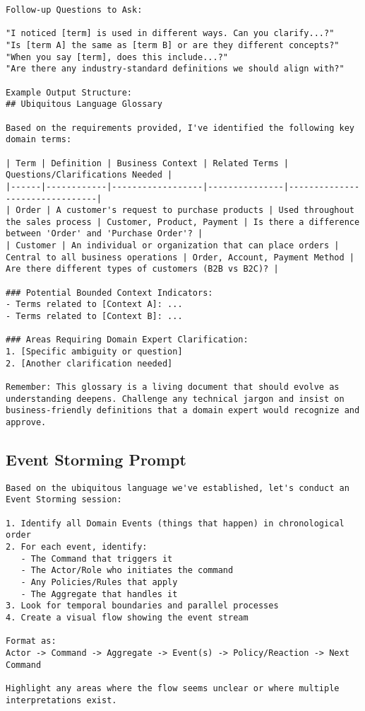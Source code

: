 \begin{verbatim}
Follow-up Questions to Ask:

"I noticed [term] is used in different ways. Can you clarify...?"
"Is [term A] the same as [term B] or are they different concepts?"
"When you say [term], does this include...?"
"Are there any industry-standard definitions we should align with?"

Example Output Structure:
## Ubiquitous Language Glossary

Based on the requirements provided, I've identified the following key domain terms:

| Term | Definition | Business Context | Related Terms | Questions/Clarifications Needed |
|------|------------|------------------|---------------|--------------------------------|
| Order | A customer's request to purchase products | Used throughout the sales process | Customer, Product, Payment | Is there a difference between 'Order' and 'Purchase Order'? |
| Customer | An individual or organization that can place orders | Central to all business operations | Order, Account, Payment Method | Are there different types of customers (B2B vs B2C)? |

### Potential Bounded Context Indicators:
- Terms related to [Context A]: ...
- Terms related to [Context B]: ...

### Areas Requiring Domain Expert Clarification:
1. [Specific ambiguity or question]
2. [Another clarification needed]

Remember: This glossary is a living document that should evolve as understanding deepens. Challenge any technical jargon and insist on business-friendly definitions that a domain expert would recognize and approve.
\end{verbatim}

\subsection{Event Storming Prompt}\label{app:event-storming-prompt}
\begin{verbatim}
Based on the ubiquitous language we've established, let's conduct an Event Storming session:

1. Identify all Domain Events (things that happen) in chronological order
2. For each event, identify:
   - The Command that triggers it
   - The Actor/Role who initiates the command
   - Any Policies/Rules that apply
   - The Aggregate that handles it
3. Look for temporal boundaries and parallel processes
4. Create a visual flow showing the event stream

Format as:
Actor -> Command -> Aggregate -> Event(s) -> Policy/Reaction -> Next Command

Highlight any areas where the flow seems unclear or where multiple interpretations exist.
\end{verbatim}


